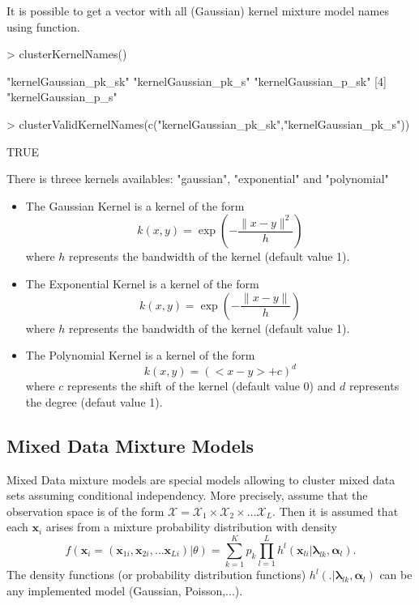 \documentclass[shortnames,nojss,article]{jss}
\newcommand{\X}{{\mathcal{X}}}
\newcommand{\bx}{\mathbf{x}}
\newcommand{\balpha}{\boldsymbol{\alpha}}
\newcommand{\blambda}{\boldsymbol{\lambda}}
\begin{document}
It is possible to get a vector with all (Gaussian) kernel mixture model names
using  function.

\begin{Schunk}
\begin{Sinput}
> clusterKernelNames()
\end{Sinput}
\begin{Soutput}
[1] "kernelGaussian_pk_sk" "kernelGaussian_pk_s"  "kernelGaussian_p_sk" 
[4] "kernelGaussian_p_s"  
\end{Soutput}
\begin{Sinput}
> clusterValidKernelNames(c("kernelGaussian_pk_sk","kernelGaussian_pk_s"))
\end{Sinput}
\begin{Soutput}
[1] TRUE
\end{Soutput}
\end{Schunk}

There is threee kernels availables: "gaussian", "exponential" and "polynomial"
\begin{itemize}
\item The Gaussian Kernel is a kernel of the form
\begin{equation*}
k(x,y) = \exp\left(- \frac{\|x-y\|^2}{h} \right)
\end{equation*}
where $h$ represents the bandwidth of the kernel (default value 1).
\item  The Exponential Kernel is a kernel of the form
\begin{equation*}
k(x,y) = \exp\left(- \frac{\|x-y\|}{h} \right)
\end{equation*}
where $h$ represents the bandwidth of the kernel (default value 1).
\item The Polynomial Kernel is a kernel of the form
\begin{equation*}
k(x,y) = \left(<x-y>+c\right)^d
\end{equation*}
where $c$  represents the shift of the kernel (default value 0)
and $d$ represents the degree (defaut value 1).
\end{itemize}

\subsection{Mixed Data Mixture Models}
\label{subsec:MixedData}

Mixed Data mixture models are special models allowing to cluster
mixed data sets assuming conditional independency. More precisely, assume
that the observation space is of the form $ \X = \X_1 \times \X_2 \times\ldots\X_L$.
Then it is assumed that each ${\bx}_i$ arises from a mixture probability
distribution with density
\begin{equation}
 f({\bx}_i=({\bx}_{1i}, {\bx}_{2i},\ldots {\bx}_{Li})|\theta)
 = \sum_{k=1}^K p_k \prod_{l=1}^L h^l({\bx}_{li}| \blambda_{lk},\balpha_l).
\end{equation}
The density functions (or probability distribution functions) $h^l(.|
\blambda_{lk},\balpha_l)$ can be any implemented model (Gaussian, Poisson,...).
\end{document}

